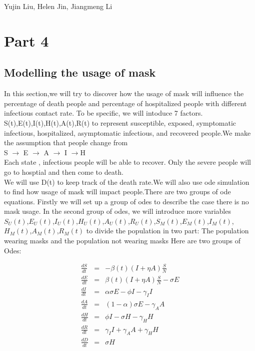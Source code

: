\documentclass{article}
\begin{document}
\begin{titlepage}
  \begin{center}
  \huge{Yujin Liu, Helen Jin, Jiangmeng Li}
  \end{center}


\end{titlepage}

\section{Part 4}
\subsection{Modelling the usage of mask}
In this section,we will try to discover how the usage of mask will influence the percentage of death people and percentage of hospitalized people with different infectious contact rate.
To be specific, we will intoduce 7 factors. S(t),E(t),I(t),H(t),A(t),R(t) to represent susceptible, exposed, symptomatic infectious, hospitalized, asymptomatic infectious, and recovered people.We make the assumption that people change from \\
S $\rightarrow$ E $\rightarrow$ A $\rightarrow$ I $\rightarrow$H \\ Each state , infectious people will be able to recover. Only the severe people will go to hosptial and then come to death.\\We will use D(t) to keep track of the death rate.We will also use ode simulation to find how usage of mask will impact people.There are two groups of ode equations. Firstly we will set up a group of odes to describe the case there is no mask usage. In the second group of odes, we will introduce more variables
$S_{U}(t)$,$E_{U}(t)$,$I_{U}(t)$,$H_{U}(t)$,$A_{U}(t)$,$R_{U}(t)$,$S_{M}(t)$,$E_{M}(t)$,$I_{M}(t)$,$H_{M}(t)$,$A_{M}(t)$,$R_{M}(t)$ to divide the population in two part: The population wearing masks and the population not wearing masks
Here are two groups of Odes:\\
\begin{minipage}{0.45\textwidth}
\begin{eqnarray}
  \frac{dS}{dt} &=& -\beta{(t)}(I+\eta A)\frac{S}{N}\nonumber\\
  \frac{dE}{dt} &=& \beta(t)(I+\eta A)\frac{S}{N}-\sigma{E}\nonumber\\
  \frac{dI}{dt} &=& \alpha\sigma{E}-\phi{I}-\gamma_{I}I\nonumber\\
  \frac{dA}{dt} &=& (1-\alpha)\sigma E-\gamma_{A}A\nonumber\\
  \frac{dH}{dt} &=& \phi I - \sigma H - \gamma_{H}H\nonumber\\
  \frac{dR}{dt} &=& \gamma_{I}{I} + \gamma_{A}{A}+\gamma_{H}{H}\nonumber\\
  \frac{dD}{dt} &=& \sigma H\nonumber\\
\end{eqnarray}
\end{minipage}
\end{document}
